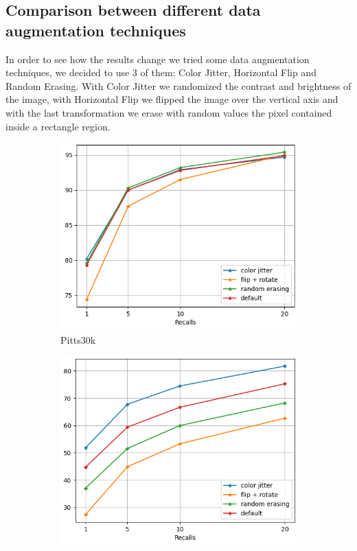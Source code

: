 \documentclass[10pt,twocolumn,letterpaper]{article}
\begin{document}
\subsection{Comparison between different data augmentation techniques}
In order to see how the results change we tried some data augmentation techniques, we decided to use 3 of them: Color Jitter, Horizontal Flip and Random Erasing. With Color Jitter we randomized the contrast and brightness of the image, with Horizontal Flip we flipped the image over the vertical axis and with the last transformation we erase with random values the pixel contained inside a rectangle region.
\begin{figure}
   \centering
   \begin{subfigure}[b]{0.23\textwidth}
      \centering
      \includegraphics[width=\textwidth]{img/augment/test_pitts30k_recalls_graph.png}
      \caption{Pitts30k}
      \label{fig:recalls:augment:pitts30k}
   \end{subfigure}
   \hfill
   \begin{subfigure}[b]{0.23\textwidth}
      \centering
      \includegraphics[width=\textwidth]{img/augment/test_st_lucia_recalls_graph.png}

\end{subfigure}
\end{figure}
\end{document}
